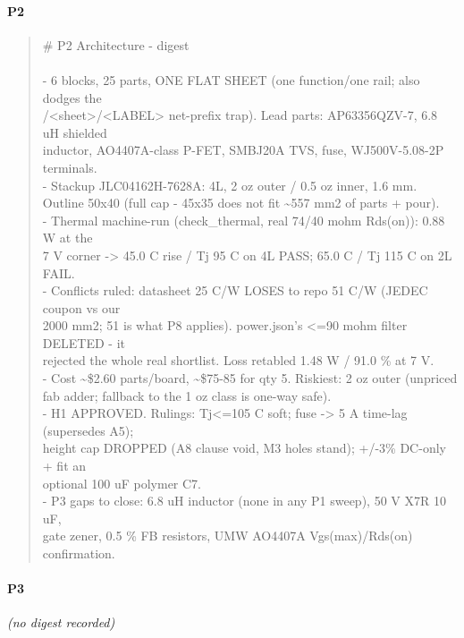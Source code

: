 \documentclass[11pt,a4paper]{article}
\begin{document}
\paragraph*{P2}
\begin{quote}\small\ttfamily\raggedright
\# P2 Architecture - digest\\
~\\
- 6 blocks, 25 parts, ONE FLAT SHEET (one function/one rail; also dodges the\\
  /\textless{}sheet\textgreater{}/\textless{}LABEL\textgreater{} net-prefix trap). Lead parts: AP63356QZV-7, 6.8 uH shielded\\
  inductor, AO4407A-class P-FET, SMBJ20A TVS, fuse, WJ500V-5.08-2P terminals.\\
- Stackup JLC04162H-7628A: 4L, 2 oz outer / 0.5 oz inner, 1.6 mm.\\
  Outline 50x40 (full cap - 45x35 does not fit \textasciitilde{}557 mm2 of parts + pour).\\
- Thermal machine-run (check\_thermal, real 74/40 mohm Rds(on)): 0.88 W at the\\
  7 V corner -\textgreater{} 45.0 C rise / Tj 95 C on 4L PASS; 65.0 C / Tj 115 C on 2L FAIL.\\
- Conflicts ruled: datasheet 25 C/W LOSES to repo 51 C/W (JEDEC coupon vs our\\
  2000 mm2; 51 is what P8 applies). power.json's \textless{}=90 mohm filter DELETED - it\\
  rejected the whole real shortlist. Loss retabled 1.48 W / 91.0 \% at 7 V.\\
- Cost \textasciitilde{}\$2.60 parts/board, \textasciitilde{}\$75-85 for qty 5. Riskiest: 2 oz outer (unpriced\\
  fab adder; fallback to the 1 oz class is one-way safe).\\
- H1 APPROVED. Rulings: Tj\textless{}=105 C soft; fuse -\textgreater{} 5 A time-lag (supersedes A5);\\
  height cap DROPPED (A8 clause void, M3 holes stand); +/-3\% DC-only + fit an\\
  optional 100 uF polymer C7.\\
- P3 gaps to close: 6.8 uH inductor (none in any P1 sweep), 50 V X7R 10 uF,\\
  gate zener, 0.5 \% FB resistors, UMW AO4407A Vgs(max)/Rds(on) confirmation.
\end{quote}
\paragraph*{P3}
\emph{(no digest recorded)}
\end{document}
